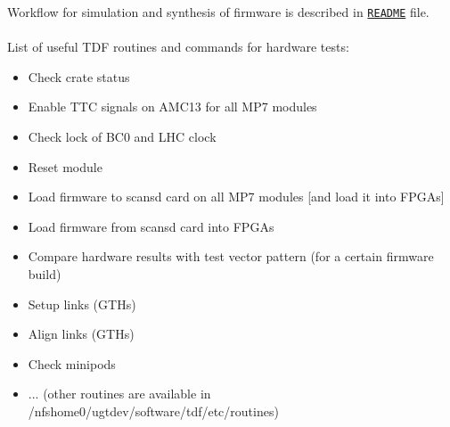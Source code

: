 Workflow for simulation and synthesis of firmware is described in \href{\gitbranch/README.md}{\texttt{README}} file.\\\\
List of useful TDF routines and commands for hardware tests:
\begin{itemize}
\item Check crate status\\
\item Enable TTC signals on AMC13 for all MP7 modules\\
\item Check lock of BC0 and LHC clock\\
\item Reset module\\
\item Load firmware to scansd card on all MP7 modules [and load it into FPGAs]\\
\item Load firmware from scansd card into FPGAs\\
\item Compare hardware results with test vector pattern (for a certain firmware build)\\
\item Setup links (GTHs)\\
\item Align links (GTHs)\\
\item Check minipods\\
\item ... (other routines are available in /nfshome0/ugtdev/software/tdf/etc/routines)
\end{itemize}

\clearpage
